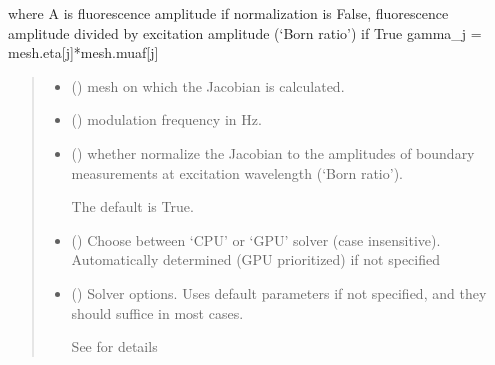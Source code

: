 \documentclass[letterpaper,10pt,english]{sphinxmanual}
\begin{document}
\begin{fulllineitems}
\sphinxAtStartPar
where A is fluorescence amplitude if normalization is False, fluorescence amplitude divided by excitation amplitude (‘Born ratio’) if True
gamma\_j = mesh.eta{[}j{]}*mesh.muaf{[}j{]}
\begin{quote}\begin{description}
\begin{itemize}
\item {} 
\sphinxAtStartPar
{} () \textendash{} mesh on which the Jacobian is calculated.

\item {} 
\sphinxAtStartPar
{} () \textendash{} modulation frequency in Hz.

\item {} 
\sphinxAtStartPar
{} (\sphinxstyleliteralemphasis{\sphinxupquote{, }}) \textendash{} 
\sphinxAtStartPar
whether normalize the Jacobian to the amplitudes of boundary measurements at excitation wavelength (‘Born ratio’).

\sphinxAtStartPar
The default is True.


\item {} 
\sphinxAtStartPar
{} (\sphinxstyleliteralemphasis{\sphinxupquote{, }}) \textendash{} Choose between ‘CPU’ or ‘GPU’ solver (case insensitive). Automatically determined (GPU prioritized) if not specified

\item {} 
\sphinxAtStartPar
{} ({\hyperref[\detokenize{_autosummary/nirfasterff.utils.SolverOptions:nirfasterff.utils.SolverOptions}]{}}\sphinxstyleliteralemphasis{\sphinxupquote{, }}) \textendash{} 
\sphinxAtStartPar
Solver options. Uses default parameters if not specified, and they should suffice in most cases.

\sphinxAtStartPar
See {\hyperref[\detokenize{_autosummary/nirfasterff.utils.SolverOptions:nirfasterff.utils.SolverOptions}]{}} for details



\end{itemize}
\end{description}
\end{quote}
\end{fulllineitems}
\end{document}
